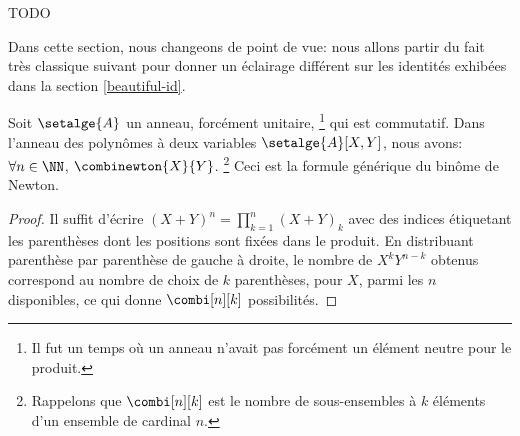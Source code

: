 TODO


Dans cette section, nous changeons de point de vue: nous allons partir du fait très classique suivant pour donner un éclairage différent sur les identités exhibées dans la section \ref{beautiful-id}.




\begin{fact} \label{bino-id-formal}
	Soit $\setalge{A}$ un anneau, forcément unitaire,%
	\footnote{
        Il fut un temps où un anneau n'avait pas forcément un élément neutre pour le produit.
	}
	qui est commutatif.
	Dans l'anneau des polynômes à deux variables $\setalge{A}[X, Y]$, nous avons:
	$\forall n \in \NN$,
	$\combinewton{X}{Y}$.%
    \footnote{
        Rappelons que $\combi[n][k]$ est le nombre de sous-ensembles à $k$ éléments d'un ensemble de cardinal $n$.
    }
	Ceci est la formule générique du binôme de Newton.
\end{fact}


\begin{proof}
	Il suffit d'écrire $(X + Y)^n = \prod_{k=1}^{n} (X + Y)_k$ avec des indices étiquetant les parenthèses dont les positions sont fixées dans le produit.
    En distribuant parenthèse par parenthèse de gauche à droite, le nombre de $X^k Y^{n-k}$ obtenus correspond au nombre de choix de $k$ parenthèses, pour $X$, parmi les $n$ disponibles, ce qui donne $\combi[n][k]$ possibilités.
\end{proof}




